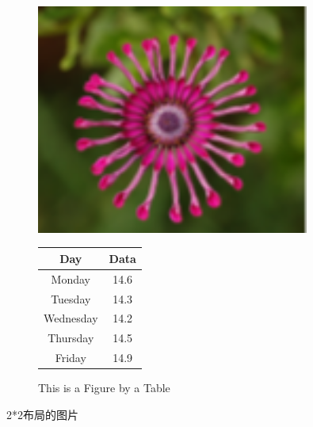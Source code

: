 \documentclass{article}
\begin{document}
\begin{CJK}{UTF8}{gbsn}
\begin{figure}[htb] 
	\begin{minipage}[b]{0.5\textwidth} 
		\centering 
		\includegraphics[width=0.8\textwidth]{imgs/flower1.png} 
		\caption{This is a Figure by a Table} 
		\label{fig:by:table} 
	\end{minipage}%
	\begin{minipage}[b]{0.5\textwidth} 
		\centering
		\begin{tabular}{|c|c|} \hline 
			Day & Data \\ \hline\hline 
			Monday    & 14.6 \\ 
			Tuesday   & 14.3 \\ 
			Wednesday & 14.2 \\ 
			Thursday  & 14.5 \\ 
			Friday    & 14.9 \\ \hline 
		\end{tabular} 
		\label{table:by:fig} 
	\end{minipage} 
\end{figure}


2*2布局的图片


\end{CJK}
\end{document}

